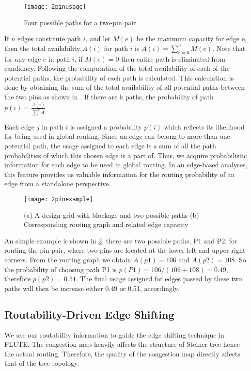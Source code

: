 \begin{itemize}
\begin{figure}[tbh!]
    \centering
    \texttt{[image: 2pinusage]}
    \caption{Four possible paths for a two-pin pair.}
    \label{fig:2pinusage}
\end{figure}

If $n$ edges constitute path $i$, and let $M(e)$ be the maximum capacity for edge e, then the total availability $A(i)$ for path $i$ is $A(i)=\sum_{e=0}^{n}M(e)$. Note that for any edge $e$ in path $i$, if $M(e)=0$ then entire path is eliminated from candidacy. Following the computation of the total availability of each of the potential paths, the probability of each path is calculated. This calculation is done by obtaining the sum of the total availability of all potential paths between the two pins as shown in .
If there are k paths, the probability of path $p(i)=\frac{A(i)}{\sum^{k}A}$

Each edge $j$ in path $i$ is assigned a probability $p(i)$ which reflects its likelihood for being used in global routing. Since an edge can belong to more than one potential path, the usage assigned to each edge is a sum of all the path probabilities of which this chosen edge is a part of. Thus, we acquire probabilistic information for each edge to be used in global routing. In an edge-based analyses, this feature provides us valuable information for the routing probability of an edge from a standalone perspective.

\begin{figure}[htbp]
    \centerline{\texttt{[image: 2pinexample]}}
    \caption{(a) A design grid with blockage and two possible paths (b) Corresponding routing graph and related edge capacity}
    \label{fig:2pinexample}
\end{figure}
An simple example is shown in \cref{fig:2pinexample}, there are two possible paths, P1 and P2, for routing the pin-pair, where two pins are located at the lower left and upper right corners. From the routing graph we obtain $A(p1)=106$ and $A(p2)=108$. So the probability of choosing path P1 is $p(P1)=106/(106+108)=0.49$, therefore $p(p2)=0.51$. The final usage assigned for edges passed by these two paths will then be increase either 0.49 or 0.51, accordingly.
\end{itemize}

\subsection{Routability-Driven Edge Shifting}
We use our routability information to guide the edge shifting technique in FLUTE\cite{fastroute}. The congestion map heavily affects the structure of Steiner tree hence the actual routing. Therefore, the quality of the congestion map directly affects that of the tree topology.

